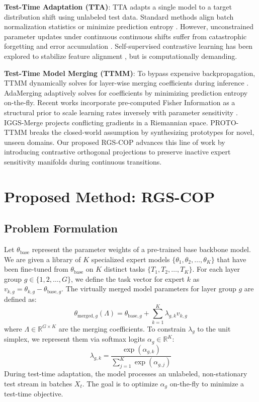 \documentclass{article}
\theoremstyle{plain}
\theoremstyle{definition}
\theoremstyle{remark}
\begin{document}
\textbf{Test-Time Adaptation (TTA)}: TTA adapts a single model to a target distribution shift using unlabeled test data. Standard methods align batch normalization statistics \cite{Schneider2020} or minimize prediction entropy \cite{Wang2021}. However, unconstrained parameter updates under continuous continuous shifts suffer from catastrophic forgetting and error accumulation \cite{Du2024}. Self-supervised contrastive learning has been explored to stabilize feature alignment \cite{Zhang23a}, but is computationally demanding.

\textbf{Test-Time Model Merging (TTMM)}: To bypass expensive backpropagation, TTMM dynamically solves for layer-wise merging coefficients during inference \cite{Yang2024, LocalMoE2025, MINGLE2025}. AdaMerging \cite{Yang2024} adaptively solves for coefficients by minimizing prediction entropy on-the-fly. Recent works incorporate pre-computed Fisher Information as a structural prior to scale learning rates inversely with parameter sensitivity \cite{Submission2Paper}. IGGS-Merge \cite{Submission7Paper} projects conflicting gradients in a Riemannian space. PROTO-TTMM \cite{Submission8Paper} breaks the closed-world assumption by synthesizing prototypes for novel, unseen domains. Our proposed RGS-COP advances this line of work by introducing contrastive orthogonal projections to preserve inactive expert sensitivity manifolds during continuous transitions.

\section{Proposed Method: RGS-COP}
\subsection{Problem Formulation}
Let $\theta_{\text{base}}$ represent the parameter weights of a pre-trained base backbone model. We are given a library of $K$ specialized expert models $\{\theta_1, \theta_2, \dots, \theta_K\}$ that have been fine-tuned from $\theta_{\text{base}}$ on $K$ distinct tasks $\{T_1, T_2, \dots, T_K\}$. For each layer group $g \in \{1, 2, \dots, G\}$, we define the task vector for expert $k$ as $v_{k, g} = \theta_{k, g} - \theta_{\text{base}, g}$. The virtually merged model parameters for layer group $g$ are defined as:
\begin{equation}
    \theta_{\text{merged}, g}(\Lambda) = \theta_{\text{base}, g} + \sum_{k=1}^K \lambda_{g, k} v_{k, g}
\end{equation}
where $\Lambda \in \mathbb{R}^{G \times K}$ are the merging coefficients. To constrain $\lambda_g$ to the unit simplex, we represent them via softmax logits $\alpha_g \in \mathbb{R}^K$:
\begin{equation}
    \lambda_{g, k} = \frac{\exp(\alpha_{g, k})}{\sum_{j=1}^K \exp(\alpha_{g, j})}
\end{equation}
During test-time adaptation, the model processes an unlabeled, non-stationary test stream in batches $X_t$. The goal is to optimize $\alpha_g$ on-the-fly to minimize a test-time objective.
\end{document}
